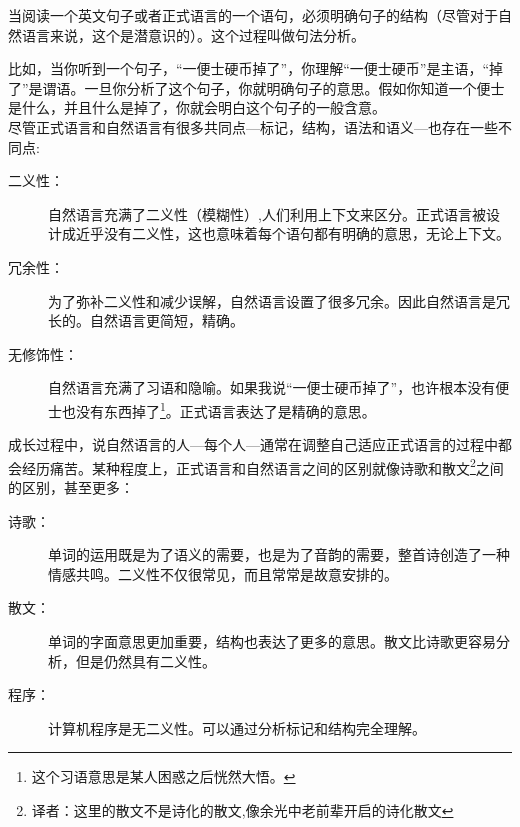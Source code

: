 当阅读一个英文句子或者正式语言的一个语句，必须明确句子的结构（尽管对于自然语言来说，这个是潜意识的）。这个过程叫做句法分析。


比如，当你听到一个句子，“一便士硬币掉了”，你理解“一便士硬币”是主语，“掉了”是谓语。一旦你分析了这个句子，你就明确句子的意思。假如你知道一个便士是什么，并且什么是掉了，你就会明白这个句子的一般含意。\\

尽管正式语言和自然语言有很多共同点---标记，结构，语法和语义---也存在一些不同点:


\begin{description}

\item[二义性：]自然语言充满了二义性（模糊性）,人们利用上下文来区分。正式语言被设计成近乎没有二义性，这也意味着每个语句都有明确的意思，无论上下文。

\item[冗余性：]为了弥补二义性和减少误解，自然语言设置了很多冗余。因此自然语言是冗长的。自然语言更简短，精确。

\item[无修饰性：]自然语言充满了习语和隐喻。如果我说“一便士硬币掉了”，也许根本没有便士也没有东西掉了\footnote{这个习语意思是某人困惑之后恍然大悟。}。正式语言表达了是精确的意思。

\end{description}

成长过程中，说自然语言的人---每个人---通常在调整自己适应正式语言的过程中都会经历痛苦。某种程度上，正式语言和自然语言之间的区别就像诗歌和散文\footnote{译者：这里的散文不是诗化的散文,像余光中老前辈开启的诗化散文}之间的区别，甚至更多：


\begin{description}

\item[诗歌：]单词的运用既是为了语义的需要，也是为了音韵的需要，整首诗创造了一种情感共鸣。二义性不仅很常见，而且常常是故意安排的。

\item[散文：]单词的字面意思更加重要，结构也表达了更多的意思。散文比诗歌更容易分析，但是仍然具有二义性。

\item[程序：]计算机程序是无二义性。可以通过分析标记和结构完全理解。


\end{description}

